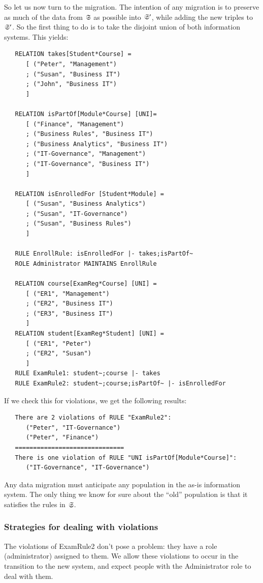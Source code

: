 \documentclass{elsarticle}
\begin{document}
   So let us now turn to the migration.
   The intention of any migration is to preserve as much of the data from $\mathfrak{S}$ as possible into $\mathfrak{S}'$,
   while adding the new triples to $\mathfrak{S}'$.
   So the first thing to do is to take the disjoint union of both information systems.
   This yields:
\begin{verbatim}
   RELATION takes[Student*Course] =
      [ ("Peter", "Management")
      ; ("Susan", "Business IT")
      ; ("John", "Business IT")
      ]
   
   RELATION isPartOf[Module*Course] [UNI]=
      [ ("Finance", "Management")
      ; ("Business Rules", "Business IT")
      ; ("Business Analytics", "Business IT")
      ; ("IT-Governance", "Management")
      ; ("IT-Governance", "Business IT")
      ]
   
   RELATION isEnrolledFor [Student*Module] =
      [ ("Susan", "Business Analytics")
      ; ("Susan", "IT-Governance")
      ; ("Susan", "Business Rules")
      ]
   
   RULE EnrollRule: isEnrolledFor |- takes;isPartOf~
   ROLE Administrator MAINTAINS EnrollRule
   
   RELATION course[ExamReg*Course] [UNI] =
      [ ("ER1", "Management")
      ; ("ER2", "Business IT")
      ; ("ER3", "Business IT")
      ]
   RELATION student[ExamReg*Student] [UNI] =
      [ ("ER1", "Peter")
      ; ("ER2", "Susan")
      ]
   RULE ExamRule1: student~;course |- takes
   RULE ExamRule2: student~;course;isPartOf~ |- isEnrolledFor
\end{verbatim}
   If we check this for violations, we get the following results:
\begin{verbatim}
   There are 2 violations of RULE "ExamRule2":
      ("Peter", "IT-Governance")
      ("Peter", "Finance")
   ==============================
   There is one violation of RULE "UNI isPartOf[Module*Course]":
      ("IT-Governance", "IT-Governance")
\end{verbatim}
   Any data migration must anticipate any population in the as-is information system.
   The only thing we know for sure about the ``old'' population is that it satisfies the rules in $\mathfrak{S}$.

\subsubsection{Strategies for dealing with violations}

The violations of ExamRule2 don't pose a problem: they have a role (administrator) assigned to them.
We allow these violations to occur in the transition to the new system, and expect people with the Administrator role to deal with them.
\end{document}
